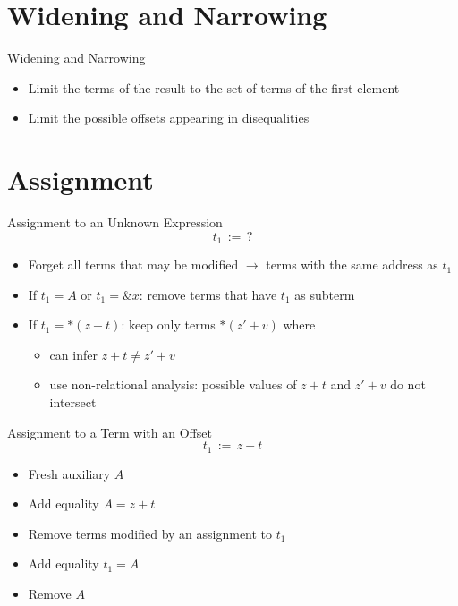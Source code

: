 \documentclass[aspectratio=169]{beamer}
\begin{document}
\section{Widening and Narrowing}
\begin{frame}{Widening and Narrowing}

    \begin{itemize}
        \item Limit the terms of the result to the set of terms of the first element
    \end{itemize}
    \begin{itemize}
        \pause
        \item Limit the possible offsets
              appearing in disequalities
    \end{itemize}

\end{frame}

\section{Assignment}

\begin{frame}{Assignment to an Unknown Expression}
    \[
        t_1\,{:=}\,?
    \]
    \begin{itemize}
        \item Forget all terms that may be modified $\rightarrow$ terms with the same address as $t_1$
              \pause
        \item If $t_1 = A$ or $t_1 = \&x$: remove terms that have $t_1$ as subterm
              \pause
        \item If $t_1 = *(z + t)$: keep only terms $*(z' + v)$ where
              \begin{itemize}
                  \item can infer $z + t \neq z' + v$ %
                  \item use non-relational analysis: possible values of $z + t$ and $z' + v$ do not intersect
              \end{itemize}
    \end{itemize}
\end{frame}

\begin{frame}{Assignment to a Term with an Offset}
    \[
        t_1\,{:=}\,z + t
    \]
    \begin{itemize}
        \item Fresh auxiliary $A$
        \item Add equality $A = z + t$
        \item Remove terms modified by an assignment to $t_1$
        \item Add equality $t_1 = A$
        \item Remove $A$
    \end{itemize}
\end{frame}
\end{document}
